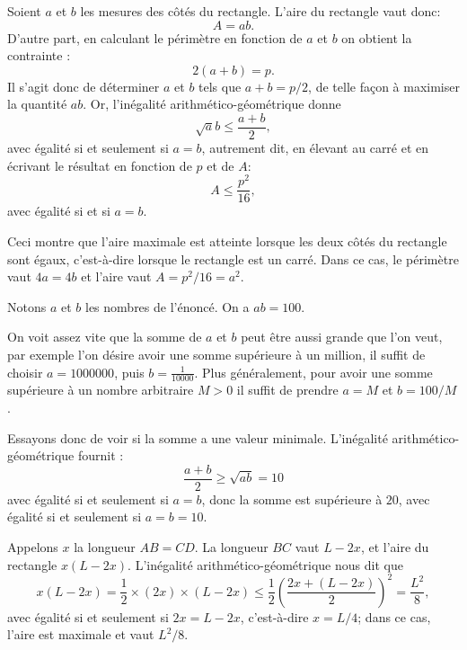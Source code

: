 \begin{Soln}{57}
Soient $a$ et $b$ les mesures des côtés du rectangle. L'aire du rectangle vaut donc:
\[ A=ab.\]
 D'autre part, en  calculant le périmètre en fonction de $a$ et $b$ on obtient la contrainte :
\[ 2(a+b)=p.\]
Il s'agit donc de déterminer $a$ et $b$ tels que $a+b=p/2$, de telle façon à maximiser la quantité $ab$. Or, l'inégalité arithmético-géométrique donne
\[ \sqrt ab \leq \frac{a+b}{2}, \]
avec égalité si et seulement si $a=b$, autrement dit, en élevant au carré et en écrivant le résultat en fonction de $p$ et de $A$:
\[ A \leq \frac{p^2}{16},\]
avec égalité si et si $a=b$.

Ceci montre que l'aire maximale est atteinte lorsque les deux côtés du rectangle sont égaux, c'est-à-dire lorsque le rectangle est un carré. Dans ce cas, le périmètre vaut $4a=4b$ et l'aire vaut $A=p^2/16 = a^2$.
\end{Soln}
\begin{Soln}{58}
Notons $a$ et $b$ les nombres de l'énoncé. On a $ab=100$.

On voit assez vite que la somme de $a$ et $b$ peut être aussi grande que l'on veut, par exemple l'on désire avoir une somme supérieure à un million, il suffit de choisir $a=1000000$, puis  $b=\frac{1}{10000}$. Plus généralement, pour avoir une somme supérieure à un nombre arbitraire $M>0$ il suffit de prendre $a=M$ et $b=100/M$.

Essayons donc de voir si la somme a une valeur minimale.
L'inégalité arithmético-géométrique fournit :
\[ \frac{a+b}{2}\geq \sqrt{ab}=10\]
avec égalité si et seulement si $a=b$, donc la somme est supérieure à $20$, avec égalité si et seulement si $a=b=10$.
\end{Soln}
\begin{Soln}{59}
Appelons $x$ la longueur $AB=CD$. La longueur $BC$ vaut $L-2x$, et l'aire du rectangle $x(L-2x)$. L'inégalité arithmético-géométrique nous dit que
$$x(L-2x) = \frac12 \times (2x)\times (L-2x) \le \frac12  \left( \frac{2x+(L-2x)}2 \right)^2=\frac{L^2}8,$$
avec égalité si et seulement si $2x=L-2x$, c'est-à-dire $x=L/4$; dans ce cas, l'aire est maximale et vaut $L^2/8$.
\end{Soln}
